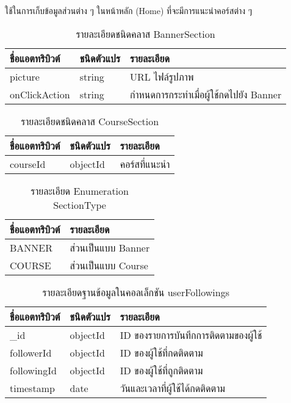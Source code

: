 \begin{table}
    \caption{รายละเอียดชนิดคลาส BannerSection}
    \noindent ใช้ในการเก็บข้อมูลส่วนต่าง ๆ ในหน้าหลัก (Home) ที่จะมีการแนะนำคอร์สต่าง ๆ
    \begin{tabularx}{\textwidth}{ | l | l | X | }
        \hline
        \bf ชื่อแอตทริบิวต์ & \bf ชนิดตัวแปร & \bf รายละเอียด \\\hline
        picture & string & URL ไฟล์รูปภาพ\\\hline
        onClickAction & string & กำหนดการกระทำเมื่อผู้ใช้กดไปยัง Banner\\\hline
    \end{tabularx}
\end{table}

\begin{table}
    \caption{รายละเอียดชนิดคลาส CourseSection}
    \begin{tabularx}{\textwidth}{ | l | l | X | }
        \hline
        \bf ชื่อแอตทริบิวต์ & \bf ชนิดตัวแปร & \bf รายละเอียด \\\hline
        courseId & objectId & คอร์สที่แนะนำ\\\hline
    \end{tabularx}
\end{table}

\begin{table}
    \caption{รายละเอียด Enumeration SectionType}
    \begin{tabularx}{\textwidth}{ | l | X | }
        \hline
        \bf ชื่อแอตทริบิวต์ & \bf รายละเอียด \\\hline
        BANNER & ส่วนเป็นแบบ Banner\\\hline
        COURSE & ส่วนเป็นแบบ Course\\\hline
    \end{tabularx}
\end{table}

\begin{table}
    \caption{รายละเอียดฐานข้อมูลในคอลเล็กชัน userFollowings}
    \begin{tabularx}{\textwidth}{ | l | l | X | }
        \hline
        \bf ชื่อแอตทริบิวต์ & \bf ชนิดตัวแปร & \bf รายละเอียด \\\hline
        \_id & objectId & ID ของรายการบันทึกการติดตามของผู้ใช้\\\hline
        followerId & objectId & ID ของผู้ใช้ที่กดติดตาม\\\hline
        followingId & objectId & ID ของผู้ใช้ที่ถูกติดตาม\\\hline
        timestamp & date & วันและเวลาที่ผู้ใช้ได้กดติดตาม\\\hline
    \end{tabularx}
\end{table}

\clearpage

